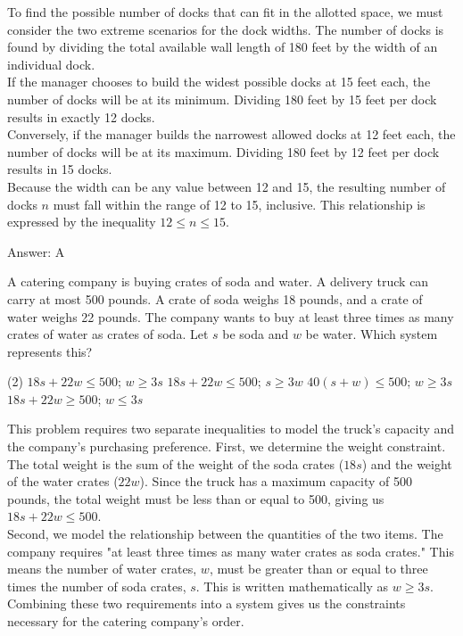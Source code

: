 \documentclass[11pt,paper=a4,answers]{exam}
\begin{document}
\begin{questions}
\begin{solution}
To find the possible number of docks that can fit in the allotted space, we must consider the two extreme scenarios for the dock widths. The number of docks is found by dividing the total available wall length of 180 feet by the width of an individual dock.
\\[10pt]
If the manager chooses to build the widest possible docks at 15 feet each, the number of docks will be at its minimum. Dividing 180 feet by 15 feet per dock results in exactly 12 docks. 
\\[10pt]
Conversely, if the manager builds the narrowest allowed docks at 12 feet each, the number of docks will be at its maximum. Dividing 180 feet by 12 feet per dock results in 15 docks. 
\\[10pt]
Because the width can be any value between 12 and 15, the resulting number of docks $n$ must fall within the range of 12 to 15, inclusive. This relationship is expressed by the inequality $12 \leq n \leq 15$.

\vspace{15pt}
Answer: \colorbox{yellow!100}{A}
\end{solution}

\question
A catering company is buying crates of soda and water. A delivery truck can carry at most 500 pounds. A crate of soda weighs 18 pounds, and a crate of water weighs 22 pounds. The company wants to buy at least three times as many crates of water as crates of soda. Let $s$ be soda and $w$ be water. Which system represents this?
\begin{tasks}(2)
    \task $18s + 22w \leq 500$; $w \geq 3s$
    \task $18s + 22w \leq 500$; $s \geq 3w$
    \task $40(s+w) \leq 500$; $w \geq 3s$
    \task $18s + 22w \geq 500$; $w \leq 3s$
\end{tasks}

\begin{solution}
This problem requires two separate inequalities to model the truck's capacity and the company's purchasing preference. First, we determine the weight constraint. The total weight is the sum of the weight of the soda crates ($18s$) and the weight of the water crates ($22w$). Since the truck has a maximum capacity of 500 pounds, the total weight must be less than or equal to 500, giving us $18s + 22w \leq 500$.
\\[10pt]
Second, we model the relationship between the quantities of the two items. The company requires "at least three times as many water crates as soda crates." This means the number of water crates, $w$, must be greater than or equal to three times the number of soda crates, $s$. This is written mathematically as $w \geq 3s$. 
\\[10pt]
Combining these two requirements into a system gives us the constraints necessary for the catering company's order.


\end{solution}
\end{questions}
\end{document}
